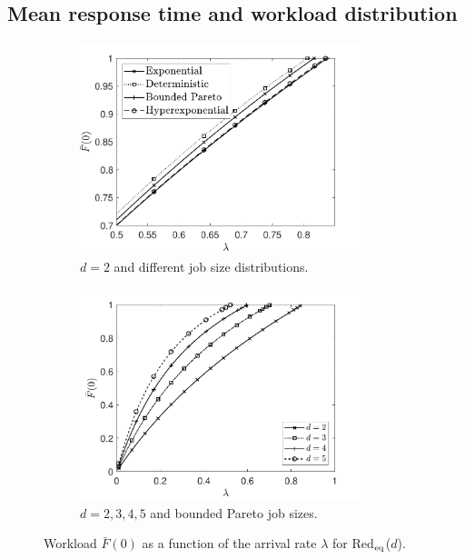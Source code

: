 \documentclass[12pt]{report}
\newcommand{\Redid}{Red$_{\textup{eq}}$($d$)}
\begin{document}
\subsection{Mean response time and workload distribution}\label{sec:MRT_WL_ind}
\begin{figure}[t]
\begin{subfigure}{.45\textwidth}
\begin{center}
\includegraphics[width=0.9\textwidth]{figures/Chapter3/plot_WL_ifo_lam_diffdists_id.pdf}
\caption{$d=2$ and different job size distributions.}
\label{fig:workloaddiffjobs}
\end{center}
\end{subfigure}
\begin{subfigure}{.45\textwidth}
\begin{center}
\includegraphics[width=0.9\textwidth]{figures/Chapter3/plotworkloadBPd2345.pdf}
\caption{$d=2,3,4,5$ and bounded Pareto job sizes.}
\label{fig:workloaddiffd}
\end{center}
\end{subfigure}
\caption{Workload $\bar{F}(0)$ as a function of the arrival rate $\lambda$ for \Redid .}
\label{fig:workload}
\end{figure}
\end{document}
